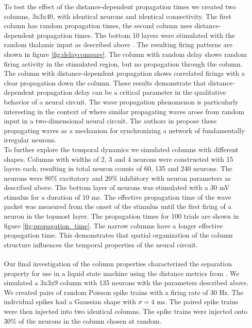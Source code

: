 \documentclass[a4paper,11pt]{article}
\begin{document}
To test the effect of the distance-dependent propagation times we created two columns, 3x3x40,  with identical neurons and identical connectivity.
The first column has random propagation times, the second column uses distance-dependent propagation times.
The bottom 10 layers were stimulated with the random thalamic input as described above \cite{izhikevich2003}.
The resulting firing patterns are shown in figure \ref{fig:delaycompare}.
The column with random delay shows random firing activity in the stimulated region, but no propagation through the column.
The column with distance-dependent propagation shows correlated firings with a clear propagation down the column.
These results demonstrate that distance-dependent propagation delay can be a critical parameter in the qualitative behavior of a neural circuit.
The wave propagation phenomenon is particularly interesting in the context of \cite{keane2015} where similar propagating waves arose from random input in a two-dimensional neural circuit.
The authors in \cite{keane2015} propose these propagating waves as a mechanism for synchronizing a network of fundamentally irregular neurons. 
\\
To further explore the temporal dynamics we simulated columns with different shapes. 
Columns with widths of 2, 3 and 4 neurons were constructed with 15 layers each, resulting in total neuron counts of 60, 135 and 240 neurons.
The neurons were 80\% excitatory and 20\% inhibitory with neuron parameters as described above. 
The bottom layer of neurons was stimulated with a 30 mV stimulus for a duration of 10 ms. 
The effective propagation time of the wave packet was measured from the onset of the stimulus until the first firing of a neuron in the topmost layer.
The propagation times for 100 trials are shown in figure \ref{fig:propagation_time}.
The narrow columns have a longer effective propagation time.
This demonstrates that spatial organization of the column structure influences the temporal properties of the neural circuit.
\\ \\
Our final investigation of the column properties characterized the separation property for use in a liquid state machine using the distance metrics from \cite{maas2002}.
We simulated a 3x3x9 column with 135 neurons with the parameters described above.
We created pairs of random Poisson spike trains with a firing rate of 30 Hz.
The individual spikes had a Gaussian shape with $\sigma=4$ ms.
The paired spike trains were then injected into two identical columns.
The spike trains were injected onto 30\% of the neurons in the column chosen at random.
\end{document}
